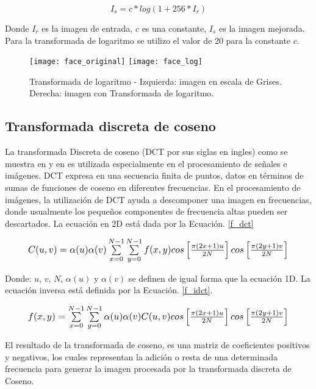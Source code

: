 \begin{equation}
\label{f_log}
I_s = c*log(1+ 256*I_r)
\end{equation}

Donde $I_r$ es la imagen de entrada, $c$ es una constante, $I_s$ es la imagen mejorada. Para la transformada de logaritmo se utilizo el valor de 20 para la constante $ c $. 

\begin{figure}[h]
\center
\texttt{[image: face\_original]}
\hspace{1cm}
\texttt{[image: face\_log]}
\caption{Transformada de logaritmo - Izquierda: imagen en escala de Grises. Derecha: imagen con Transformada de logaritmo.}
\label{im:log}
\end{figure}

\subsection{Transformada discreta de coseno}
La transformada Discreta de coseno (DCT por sus siglas en ingles) como se muestra en \cite{thamiz2015liter} y en \cite{vish2015ill} es utilizada especialmente en el procesamiento de señales e imágenes. DCT expresa en una secuencia finita de puntos, datos en términos de sumas de funciones de coseno en diferentes frecuencias. En el procesamiento de imágenes, la utilización de DCT ayuda a descomponer una imagen en frecuencias, donde usualmente los pequeños componentes de frecuencia altas pueden ser descartados. La ecuación en 2D está dada por la Ecuación. \ref{f_dct}

\begin{equation}
	\label{f_dct}
	\resizebox{0.91\hsize}{!}{
		$ C(u,v) = \alpha(u)\alpha(v)\sum\limits_{x=0}^{N-1} \sum\limits_{y=0}^{N-1}f(x,y)cos\left[\frac{\pi(2x + 1)u}{2N}\right]cos\left[\frac{\pi(2y + 1)v}{2N}\right] $
	}
\end{equation}

Donde: $u$, $v$, $N$, $\alpha(u)$ y $\alpha(v)$ se definen de igual forma que la ecuación 1D. La ecuación inversa está definida por la Ecuación. \ref{f_idct}.

\begin{equation}
	\label{f_idct}
	\resizebox{0.91\hsize}{!}{
		$ f(x,y) = \sum\limits_{x=0}^{N-1}\sum\limits_{y=0}^{N-1} \alpha(u)\alpha(v)C(u,v)cos\left[\frac{\pi(2x + 1)u}{2N}\right]cos\left[\frac{\pi(2y + 1)v}{2N}\right]$
	}
\end{equation}

El resultado de la transformada de coseno, es una matriz de coeficientes positivos y negativos, los cuales representan la adición o resta de una determinada frecuencia para generar la imagen procesada por la transformada discreta de Coseno.

